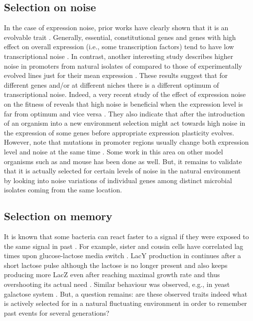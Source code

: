 \subsection{Selection on noise}
In the case of expression noise, prior works have clearly shown that it is an evolvable trait \cite{richard2014does}.
Generally, essential, constitutional genes and genes with high effect on overall expression (i.e., some transcription factors) tend to have low transcriptional noise \cite{silander2012genome, metzger2015selection}.
In contrast, another interesting study describes higher noise in promoters from natural isolates of  compared to those of experimentally evolved lines just for their mean expression \cite{wolf2015expression}.
These results suggest that for different genes and/or at different niches there is a different optimum of transcriptional noise.
Indeed, a very recent study of the effect of expression noise on the fitness of  reveals that high noise is beneficial when the expression level is far from optimum and vice versa \cite{duveau2018fitness}.
They also indicate that after the introduction of an organism into a new environment selection might act towards high noise in the expression of some genes before appropriate expression plasticity evolves.
However, note that mutations in promoter regions usually change both expression level and noise at the same time \cite{metzger2015selection}.
Some work in this area on other model organisms such as  \cite{schor2017promoter} and mouse \cite{barroso2017evolution} has been done as well.
But, it remains to validate that it is actually selected for certain levels of noise in the natural environment by looking into noise variations of individual genes among distinct microbial isolates coming from the same location.

\subsection{Selection on memory}
It is known that some bacteria can react faster to a signal if they were exposed to the same signal in past \cite{novick1957enzyme}.
For example, sister and cousin cells have correlated lag times upon glucose-lactose media switch \cite{boulineau2013single, kaiser2018monitoring}.
LacY production in  continues after a short lactose pulse although the lactose is no longer present \cite{lambert2014memory} and  also keeps producing more LacZ even after reaching maximal growth rate and thus overshooting its actual need \cite{kaiser2018monitoring}.
Similar behaviour was observed, e.g., in yeast galactose system \cite{zacharioudakis2007yeast, razinkov2013measuring}.
But, a question remains: are these observed traits indeed what is actively selected for in a natural fluctuating environment in order to remember past events for several generations?

